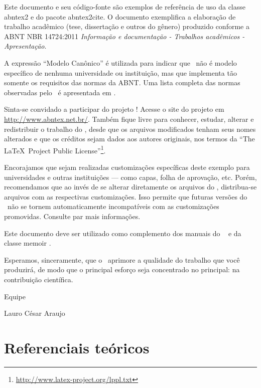 \documentclass[
	12pt,				%
	openright,			%
	twoside,			%
	a4paper,			%
	english,			%
	french,				%
	spanish,			%
	brazil				%
	]{abntex2}
\begin{document}
Este documento e seu código-fonte são exemplos de referência de uso da classe
\textsf{abntex2} e do pacote \textsf{abntex2cite}. O documento 
exemplifica a elaboração de trabalho acadêmico (tese, dissertação e outros do
gênero) produzido conforme a ABNT NBR 14724:2011 \emph{Informação e documentação
- Trabalhos acadêmicos - Apresentação}.

A expressão ``Modelo Canônico'' é utilizada para indicar que \abnTeX\ não é
modelo específico de nenhuma universidade ou instituição, mas que implementa tão
somente os requisitos das normas da ABNT. Uma lista completa das normas
observadas pelo \abnTeX\ é apresentada em .

Sinta-se convidado a participar do projeto \abnTeX! Acesse o site do projeto em
\url{http://www.abntex.net.br/}. Também fique livre para conhecer,
estudar, alterar e redistribuir o trabalho do \abnTeX, desde que os arquivos
modificados tenham seus nomes alterados e que os créditos sejam dados aos
autores originais, nos termos da ``The \LaTeX\ Project Public
License''\footnote{\url{http://www.latex-project.org/lppl.txt}}.

Encorajamos que sejam realizadas customizações específicas deste exemplo para
universidades e outras instituições --- como capas, folha de aprovação, etc.
Porém, recomendamos que ao invés de se alterar diretamente os arquivos do
\abnTeX, distribua-se arquivos com as respectivas customizações.
Isso permite que futuras versões do \abnTeX~não se tornem automaticamente
incompatíveis com as customizações promovidas. Consulte
 par mais informações.

Este documento deve ser utilizado como complemento dos manuais do \abnTeX\ 
\cite{abntex2classe,abntex2cite,abntex2cite-alf} e da classe \textsf{memoir}
\cite{memoir}. 

Esperamos, sinceramente, que o \abnTeX\ aprimore a qualidade do trabalho que
você produzirá, de modo que o principal esforço seja concentrado no principal:
na contribuição científica.

Equipe \abnTeX 

Lauro César Araujo

\part{Referenciais teóricos}
\end{document}
